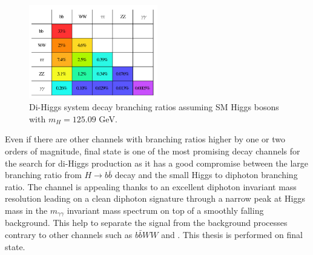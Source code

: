 \begin{figure}[htbp]
    \centering
    \includegraphics[width=0.5\textwidth]{Ch1/Img/HH_decays.png}
    \caption{Di-Higgs system decay branching ratios assuming SM Higgs bosons with $m_H=125.09$ GeV.}
    \label{fig:chap1:HH:HPD:DCY}
\end{figure}
Even if there are other channels with branching ratios higher by one or two orders of magnitude, \bbyy final state is one of the most promising decay channels for the search for di-Higgs production as it has a good compromise between the large branching ratio from $H\to b\bar{b}$ decay and the small Higgs to diphoton branching ratio. The \bbyy channel is appealing thanks to an excellent diphoton invariant mass resolution leading on a clean diphoton signature through a narrow peak at Higgs mass in the $m_{\gamma\gamma}$ invariant mass spectrum on top of a smoothly falling background. This help to separate the signal from the background processes contrary to other channels such as \bbbb $b\bar{b}WW$ and \bbtt. This thesis is performed on \bbyy final state.

